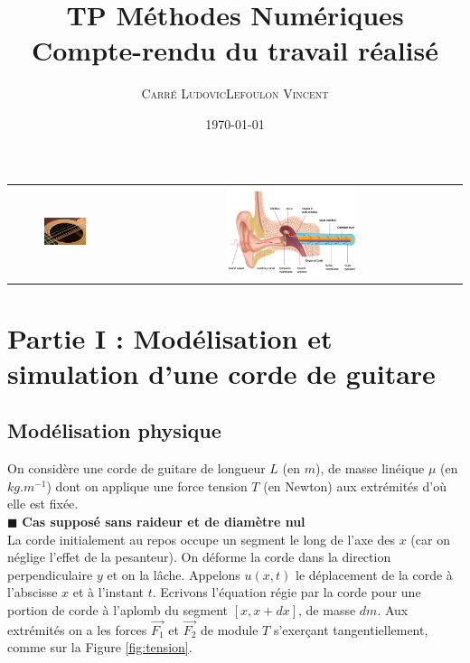\documentclass[a4,12pt]{article}
\title{\textbf{TP Méthodes Numériques \\ Compte-rendu du travail réalisé}}
\author{
\begin{tabular}{cc}
	\textsc{Carré Ludovic} & \textsc{Lefoulon Vincent} \\
\end{tabular}}
\date{\small \today}
\begin{document}
\maketitle

\begin{center}
	\begin{tabular}{cc} 
		\includegraphics[width=0.4\textwidth]{images/guitare.pdf} & 
		\includegraphics[width=0.4\textwidth]{images/oreille.pdf} 
	\end{tabular}
\end{center}

 \newpage


\section*{Partie I : Modélisation et simulation d'une corde de guitare}

\subsection{Modélisation physique}

On considère une corde de guitare de longueur $L$ (en $m$), de masse linéique $\mu$ (en $kg.m^{-1}$) dont on applique une force tension $T$ (en Newton) aux extrémités d'où elle est fixée. \\

\indent $\blacksquare$ \textbf{Cas supposé sans raideur et de diamètre nul}\\

La corde initialement au repos occupe un segment le long de l'axe des $x$ (car on néglige l'effet de la pesanteur). On déforme la corde dans la direction perpendiculaire $y$ et on la lâche. Appelons $u(x,t)$ le déplacement de la corde à l'abscisse $x$ et à l'instant $t$. Ecrivons l'équation régie par la corde pour une portion de corde à l'aplomb du segment $[x,x +dx]$, de masse $dm$. Aux extrémités on a les forces $\vec{F_1}$ et $\vec{F_2}$ de module $T$ s'exerçant tangentiellement, comme sur la Figure \ref{fig:tension}.\\
\end{document}
